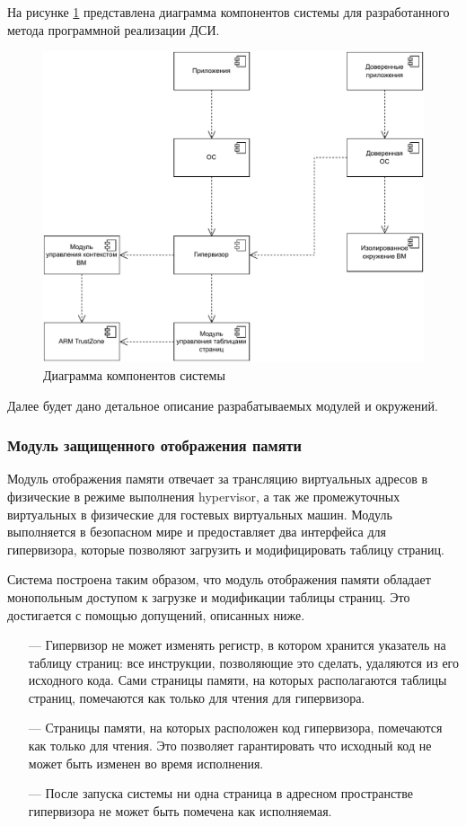 На рисунке \ref{fig:full-design} представлена диаграмма компонентов системы для разработанного метода программной реализации ДСИ.

\begin{figure}[h]
	\centering
	\includegraphics[width=\textwidth]{img/design-diagram-of-components.pdf}
	\caption{Диаграмма компонентов системы}
	\label{fig:full-design}
\end{figure}

Далее будет дано детальное описание разрабатываемых модулей и окружений.

\subsubsection{Модуль защищенного отображения памяти}

Модуль отображения памяти отвечает за трансляцию виртуальных адресов в физические в режиме выполнения hypervisor, а так же промежуточных виртуальных в физические для гостевых виртуальных машин. Модуль выполняется в безопасном мире и предоставляет два интерфейса для гипервизора, которые позволяют загрузить и модифицировать таблицу страниц.

Система построена таким образом, что модуль отображения памяти обладает монопольным доступом к загрузке и модификации таблицы страниц. Это достигается с помощью допущений, описанных ниже.

\begin{itemize}
	\item [---] Гипервизор не может изменять регистр, в котором хранится указатель на таблицу страниц: все инструкции, позволяющие это сделать, удаляются из его исходного кода. Сами страницы памяти, на которых располагаются таблицы страниц, помечаются как только для чтения для гипервизора.
	\item [---] Страницы памяти, на которых расположен код гипервизора, помечаются как только для чтения. Это позволяет гарантировать что исходный код не может быть изменен во время исполнения.
	\item [---] После запуска системы ни одна страница в адресном пространстве гипервизора не может быть помечена как исполняемая.
\end{itemize}

